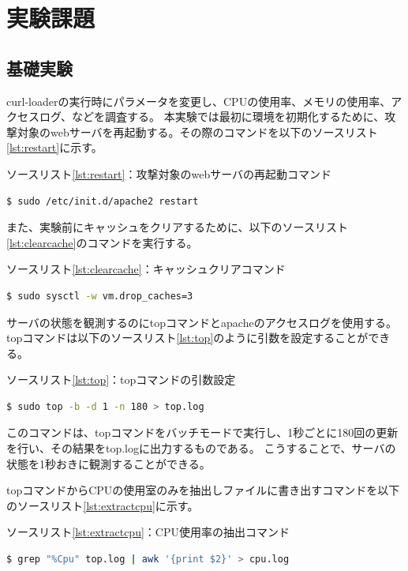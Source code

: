\documentclass[dvipdfmx]{jsarticle}
\begin{document}
\section{実験課題}
\subsection{基礎実験} \label{sec:basicexperiment}
curl-loaderの実行時にパラメータを変更し、CPUの使用率、メモリの使用率、アクセスログ、などを調査する。
本実験では最初に環境を初期化するために、攻撃対象のwebサーバを再起動する。その際のコマンドを以下のソースリスト\ref{lst:restart}に示す。
\begin{center}
    ソースリスト\ref{lst:restart}：攻撃対象のwebサーバの再起動コマンド
\end{center}
\begin{lstlisting}[language=Bash, label={lst:restart}]
$ sudo /etc/init.d/apache2 restart
\end{lstlisting}

また、実験前にキャッシュをクリアするために、以下のソースリスト\ref{lst:clearcache}のコマンドを実行する。
\begin{center}
    ソースリスト\ref{lst:clearcache}：キャッシュクリアコマンド
\end{center}
\begin{lstlisting}[language=Bash, label={lst:clearcache}]
$ sudo sysctl -w vm.drop_caches=3
\end{lstlisting}

サーバの状態を観測するのにtopコマンドとapacheのアクセスログを使用する。
topコマンドは以下のソースリスト\ref{lst:top}のように引数を設定することができる。

\begin{center}
    ソースリスト\ref{lst:top}：topコマンドの引数設定
\end{center}
\begin{lstlisting}[language=Bash, label={lst:top}]
$ sudo top -b -d 1 -n 180 > top.log
\end{lstlisting}

このコマンドは、topコマンドをバッチモードで実行し、1秒ごとに180回の更新を行い、その結果をtop.logに出力するものである。
こうすることで、サーバの状態を1秒おきに観測することができる。

topコマンドからCPUの使用室のみを抽出しファイルに書き出すコマンドを以下のソースリスト\ref{lst:extractcpu}に示す。
\begin{center}
    ソースリスト\ref{lst:extractcpu}：CPU使用率の抽出コマンド
\end{center}
\begin{lstlisting}[language=Bash, label={lst:extractcpu}]
$ grep "%Cpu" top.log | awk '{print $2}' > cpu.log
\end{lstlisting}
\end{document}
